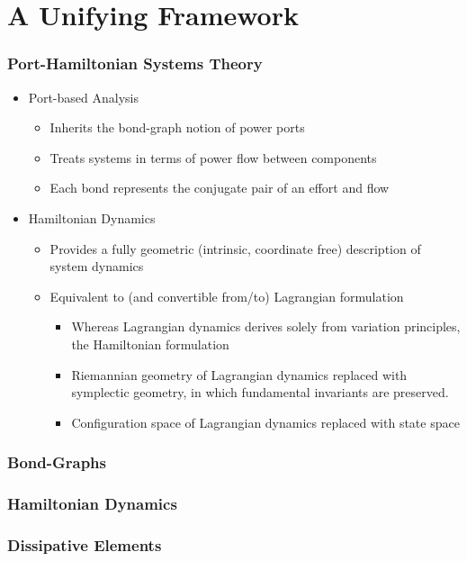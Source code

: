 \documentclass[aspectratio=169]{beamer}
\begin{document}
	\section{A Unifying Framework}
		\begin{frame}
			\frametitle{Port-Hamiltonian Systems Theory}
			\begin{itemize}
				\item Port-based Analysis
					\begin{itemize}
						\item Inherits the bond-graph notion of power ports
						\item Treats systems in terms of power flow between components
						\item Each bond represents the conjugate pair of an effort and flow
					\end{itemize}\pause
				\item Hamiltonian Dynamics
					\begin{itemize}
						\item Provides a fully geometric (intrinsic, coordinate free) description of system dynamics
						\item Equivalent to (and convertible from/to) Lagrangian formulation
							\begin{itemize}
								\item Whereas Lagrangian dynamics derives solely from variation principles, the Hamiltonian formulation 
								\item Riemannian geometry of Lagrangian dynamics replaced with symplectic geometry, in which fundamental invariants are preserved.
								\item Configuration space of Lagrangian dynamics replaced with state space
							\end{itemize}
					\end{itemize}
			\end{itemize}
		\end{frame}
	
		\begin{frame}
			\frametitle{Bond-Graphs}
			
		\end{frame}

		\begin{frame}
			\frametitle{Hamiltonian Dynamics}
			
		\end{frame}
	
		\begin{frame}
			\frametitle{Dissipative Elements}
		\end{frame}
\end{document}

